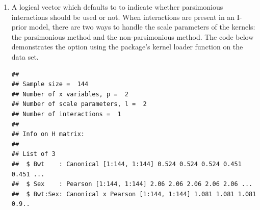 \begin{enumerate}
\item {}

A logical vector which defaults to  to indicate whether parsimonious interactions should be used or not. When interactions are present in an I-prior model, there are two ways to handle the scale parameters of the kernels: the parsimonious method and the non-parsimonious method. The code below demonstrates the  option using the package's kernel loader function on the  data set.

\begin{knitrout}
\color{fgcolor}\begin{kframe}
\begin{alltt}
 \hlkwb{<-}  \hlopt{~}  \hlopt{+}  \hlopt{+} \hlopt{:}  
\end{alltt}
\end{kframe}
\end{knitrout}
\begin{knitrout}
\color{fgcolor}\begin{kframe}
\begin{verbatim}
## 
## Sample size =  144 
## Number of x variables, p =  2 
## Number of scale parameters, l =  2 
## Number of interactions =  1 
## 
## Info on H matrix:
## 
## List of 3
##  $ Bwt    : Canonical [1:144, 1:144] 0.524 0.524 0.524 0.451 0.451 ...
##  $ Sex    : Pearson [1:144, 1:144] 2.06 2.06 2.06 2.06 2.06 ...
##  $ Bwt:Sex: Canonical x Pearson [1:144, 1:144] 1.081 1.081 1.081 0.9..
\end{verbatim}
\end{kframe}
\end{knitrout}
\begin{knitrout}
\color{fgcolor}\begin{kframe}
\begin{alltt}
 \hlkwb{<-}  \hlopt{~}  \hlopt{+}  \hlopt{+} \hlopt{:}  
               \hlstd{=} \hlstd{(} \hlstd{=} \hlstd{)))}
\end{alltt}
\end{kframe}
\end{knitrout}

\end{enumerate}
